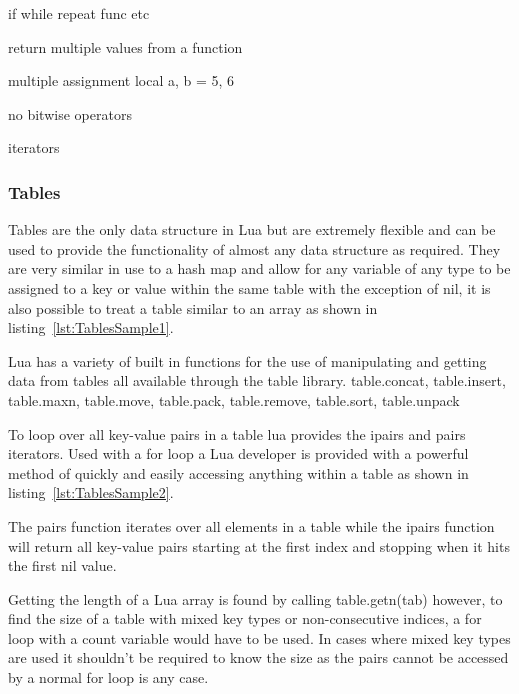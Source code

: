 \documentclass[11pt,a4paper,titlepage]{article}
\begin{document}
	

	if while repeat func etc

	return multiple values from a function

	multiple assignment local a, b = 5, 6

	no bitwise operators

	iterators

\subsubsection{Tables}
	Tables are the only data structure in Lua but are extremely flexible and can be used to provide the functionality of almost any data structure as required. They are very similar in use to a hash map and allow for any variable of any type to be assigned to a key or value within the same table with the exception of nil, it is also possible to treat a table similar to an array as shown in listing~\ref{lst:TablesSample1}.
	

	Lua has a variety of built in functions for the use of manipulating and getting data from tables all available through the table library.
	table.concat, table.insert, table.maxn, table.move, table.pack, table.remove, table.sort, table.unpack

	To loop over all key-value pairs in a table lua provides the ipairs and pairs iterators. Used with a for loop a Lua developer is provided with a powerful method of quickly and easily accessing anything within a table as shown in listing~\ref{lst:TablesSample2}.
	

	The pairs function iterates over all elements in a table while the ipairs function will return all key-value pairs starting at the first index and stopping when it hits the first nil value.~\cite{Ierusalimschy:2013:PLT:2502646} 
	
	Getting the length of a Lua array is found by calling table.getn(tab) however, to find the size of a table with mixed key types or non-consecutive indices, a for loop with a count variable would have to be used. In cases where mixed key types are used it shouldn't be required to know the size as the pairs cannot be accessed by a normal for loop is any case.
	
\end{document}
